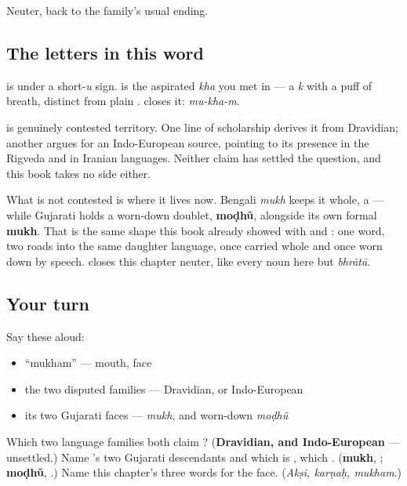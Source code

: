 Neuter, back to the family's usual ending.

\subsection*{The letters in this word}
\textbf{} is \textbf{} under a short-\emph{u} sign. \textbf{} is the aspirated \emph{kha} you met in \textbf{} — a \emph{k} with a puff of breath, distinct from plain \textbf{}. \textbf{} closes it: \emph{mu-kha-m}.

\begin{cousinweb}
 is genuinely contested territory. One line of scholarship derives it from Dravidian; another argues for an Indo-European source, pointing to its presence in the Rigveda and in Iranian languages. Neither claim has settled the question, and this book takes no side either.

What is not contested is where it lives now. Bengali \emph{mukh} keeps it whole, a  — while Gujarati holds a worn-down  doublet, \textbf{moḍhũ}, alongside its own formal \textbf{mukh}. That is the same shape this book already showed with \textbf{} and \textbf{}: one word, two roads into the same daughter language, once carried whole and once worn down by speech.  closes this chapter neuter, like every noun here but \emph{bhrātā}.
\end{cousinweb}

\subsection*{Your turn}
Say these aloud:

\begin{itemize}
\raggedright
  \item \textquotedblleft{}mukham\textquotedblright{} — mouth, face
  \item the two disputed families — Dravidian, or Indo-European
  \item its two Gujarati faces — \emph{mukh}, and worn-down \emph{moḍhũ}
\end{itemize}

\begin{tcolorbox}[breakable,colback=teal!4,colframe=teal!35!black,title={Before you move on}]
Which two language families both claim ? (\textbf{Dravidian, and Indo-European} — unsettled.) Name 's two Gujarati descendants and which is , which . (\textbf{mukh}, ; \textbf{moḍhũ}, .) Name this chapter's three words for the face. (\emph{Akṣi, karṇaḥ, mukham}.)
\end{tcolorbox}
